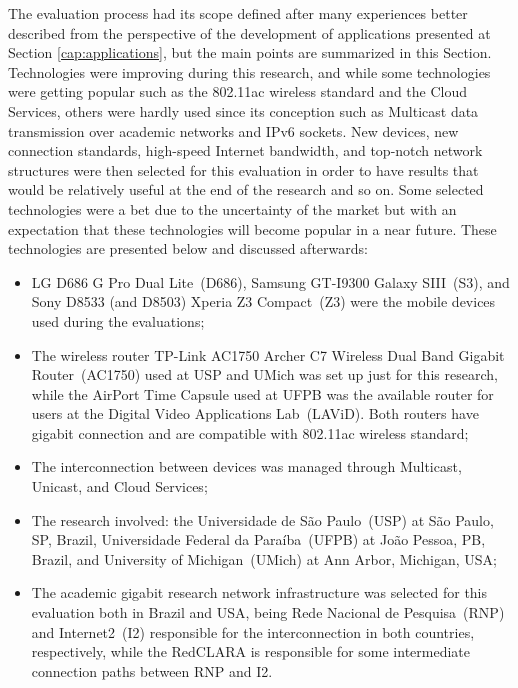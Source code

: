 The evaluation process had its scope defined after many experiences better described from the perspective of the development of applications presented at Section \ref{cap:applications}, but the main points are summarized in this Section.
Technologies were improving during this research, and while some technologies were getting popular such as the 802.11ac wireless standard and the Cloud Services, others were hardly used since its conception such as Multicast data transmission over academic networks and IPv6 sockets.
New devices, new connection standards, high-speed Internet bandwidth, and top-notch network structures were then selected for this evaluation in order to have results that would be relatively useful at the end of the research and so on.
Some selected technologies were a bet due to the uncertainty of the market but with an expectation that these technologies will become popular in a near future.
These technologies are presented below and discussed afterwards:
\begin{itemize}
	\item LG D686 G Pro Dual Lite~(D686), Samsung GT-I9300 Galaxy SIII~(S3), and Sony D8533 (and D8503) Xperia Z3 Compact~(Z3) were the mobile devices used during the evaluations;
	\item The wireless router TP-Link AC1750 Archer C7 Wireless Dual Band Gigabit Router~(AC1750) used at USP and UMich was set up just for this research, while the AirPort Time Capsule used at UFPB was the available router for users at the Digital Video Applications Lab~(LAViD). Both routers have gigabit connection and are compatible with 802.11ac wireless standard;
	\item The interconnection between devices was managed through Multicast, Unicast, and Cloud Services;
	\item The research involved: the Universidade de São Paulo~(USP) at São Paulo, SP, Brazil, Universidade Federal da Paraíba~(UFPB) at João Pessoa, PB, Brazil, and University of Michigan~(UMich) at Ann Arbor, Michigan, USA;
	\item The academic gigabit research network infrastructure was selected for this evaluation both in Brazil and USA, being Rede Nacional de Pesquisa~(RNP) and Internet2~(I2) responsible for the interconnection in both countries, respectively, while the RedCLARA is responsible for some intermediate connection paths between RNP and I2.
\end{itemize}

